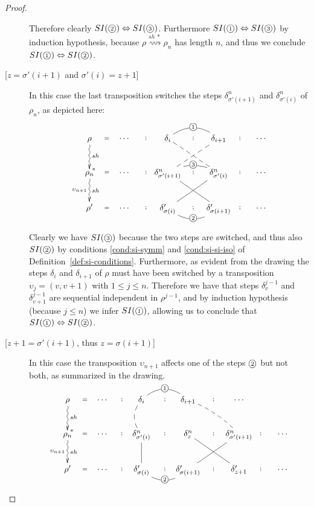 \documentclass{llncs}
\newcommand{\cycl}[1]{\ensuremath{\mbox{\textcircled{\scriptsize{$#1$}}}}}
\renewcommand{\iff}{\ensuremath{\Leftrightarrow}}
\begin{document}
\begin{proof}
\begin{description}
Therefore clearly $SI(\cycl{2}) \iff SI(\cycl{3})$. Furthermore $SI(\cycl{1}) \iff SI(\cycl{3})$  by induction hypothesis, because $\rho  \stackrel{sh\ *}{\rightsquigarrow} \rho_n$  has length $n$, and thus we conclude $SI(\cycl{1}) \iff SI(\cycl{2})$.

\item  [{[$z = \sigma'(i+1)$ and $\sigma'(i) = z+1$]}]  In this case the last transposition switches the steps $\delta^n_{\sigma'(i+1)}$ and $\delta^n_{\sigma'(i)}$  of $\rho_n$, as depicted here:


$$\xymatrix@C=2pc@R=2pc{
 \rho  \ar@{~>}[d]^{sh}^(.9){*} \ar@{}[r]|{=} &
   \cdots   \ar@{}[r]|{;}  &
    \delta_i \ar@{--}[dr]  \ar@{}[r]|{;} \ar@{-}@/^3ex/[r]|{\cycl{1}} &
    \delta_{i+1} \ar@{--}[dl]  \ar@{}[r]|{;}  & \cdots\\
\rho_n  \ar@{~>}[d]^{sh}_{\upsilon_{n+1}}  \ar@{}[r]|{=} &
   \cdots   \ar@{}[r]|{;}  &
    \delta^n_{\sigma'(i+1)} \ar@{-}[dr]  \ar@{}[r]|{;}  \ar@{-}@/^2ex/[r]|{\cycl{3}}  &
   \delta^n_{\sigma'(i)} \ar@{-}[dl]  \ar@{}[r]|{;} &
    \cdots\\
\rho'  \ar@{}[r]|{=} & 
    \cdots   \ar@{}[r]|{;}  &
     \delta'_{\sigma(i)} \ar@{}[r]|{;} \ar@{-}@/_3ex/[r]|{\cycl{2}} &
    \delta'_{\sigma(i+1)}  \ar@{}[r]|{;} &
     \cdots  \\
}$$

Clearly we have $SI(\cycl{3})$ because the two steps are switched, and thus also $SI(\cycl{2})$ by  conditions  \ref{cond:si-symm} and \ref{cond:si-si-iso} of Definition~\ref{def:si-conditions}. Furthermore, as evident from the drawing the steps $\delta_i$ and $\delta_{i+1}$ of $\rho$ must have been switched by a transposition $\upsilon_j = (v, v+1)$ with $1 \leq j \leq n$.  Therefore we have that steps $\delta^{j-1}_v$ and $\delta^{j-1}_{v+1}$  are sequential independent in $\rho^{j-1}$, and by induction hypothesis  (because $j \leq n$) we infer $SI(\cycl{1})$, allowing us to conclude that $SI(\cycl{1}) \iff SI(\cycl{2})$.
 
\item  [{[$z+1 = \sigma'(i+1)$, thus $z = \sigma(i+1)$]}]  

In this case the transposition $\upsilon_{n+1}$ affects one of the steps \cycl{2} but not both, as summarized in the drawing.
$$\xymatrix@C=2pc@R=2pc{
 \rho  \ar@{~>}[d]^{sh}^(.9){*} \ar@{}[r]|{=} &
   \cdots   \ar@{}[r]|{;}  &
    \delta_i \ar@{--}@/_2ex/[d]  \ar@{}[r]|{;} \ar@{-}@/^3ex/[r]|{\cycl{1}} &
    \delta_{i+1} \ar@{--}@/^1ex/[dr]  \ar@{}[r]|{;}  & \cdots\\
\rho_n  \ar@{~>}[d]^{sh}_{\upsilon_{n+1}}  \ar@{}[r]|{=} &
   \cdots   \ar@{}[r]|{;}  &
    \delta^n_{\sigma'(i)} \ar@{-}[d]  \ar@{}[r]|{;}   &
   \delta^n_z \ar@{-}[dr]  \ar@{}[r]|{;} &
   \delta^n_{\sigma'(i+1)} \ar@{-}[dl]  \ar@{}[r]|{;} &
    \cdots\\
\rho'  \ar@{}[r]|{=} & 
    \cdots   \ar@{}[r]|{;}  &
     \delta'_{\sigma(i)} \ar@{}[r]|{;} \ar@{-}@/_3ex/[r]|{\cycl{2}} &
    \delta'_{\sigma(i+1)}  \ar@{}[r]|{;} &
    \delta'_{z+1}  \ar@{}[r]|{;} &
     \cdots  \\
}$$


\end{description}
\end{proof}
\end{document}
